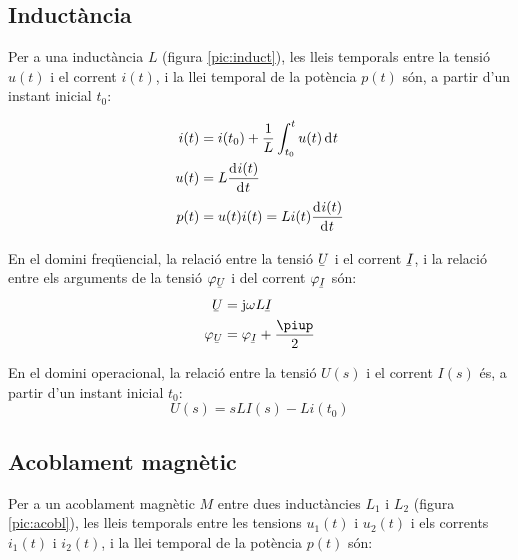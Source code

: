 \subsection{Inductància} 

Per a una inductància $L$ (figura \vref{pic:induct}),
les lleis temporals entre la tensió $u(t)$ i el corrent $i(t)$, i la llei temporal
de la potència $p(t)$ són,  a partir d'un instant inicial $t_0$:

\hfill
\begin{minipage}[b]{5cm}
	
	\label{pic:induct}
\end{minipage}
\hfill
\begin{minipage}[b][3.8cm][t]{8cm}
	\begin{align}
		i(t) &= i(t_0) + \frac{1}{L} \int_{t_0}^t u(t) \diff t \\
		u(t) &= L \deriv{i(t)}{t} \\
		p(t) &= u(t) i(t) = L i(t) \deriv{i(t)}{t}
	\end{align}
\end{minipage}

En el domini freqüencial, la relació entre la tensió $\cmplx{U}$ i el corrent $\cmplx{I}$, i la relació entre els arguments de la tensió $\varphi_{\cmplx{U}}$ i del corrent $\varphi_{\cmplx{I}}$ són:
\begin{align}
	\cmplx{U} &= \ju \omega L \cmplx{I} \\
	\varphi_{\cmplx{U}} &= \varphi_{\cmplx{I}} + \frac{\piup}{2}
\end{align}

 En el domini operacional, la relació entre la tensió $U(s)$ i el corrent $I(s)$ és, a partir d'un instant inicial $t_0$:
\begin{equation}
	U(s) = s L I(s) - L i(t_0)
\end{equation}


\subsection{Acoblament magnètic} 

Per a un acoblament magnètic $M$ entre dues
inductàncies $L_1$ i $L_2$ (figura \vref{pic:acobl}), les lleis temporals entre les
tensions $u_1(t)$ i $u_2(t)$ i els corrents $i_1(t)$ i $i_2(t)$,  i la llei temporal
de la potència $p(t)$ són:


